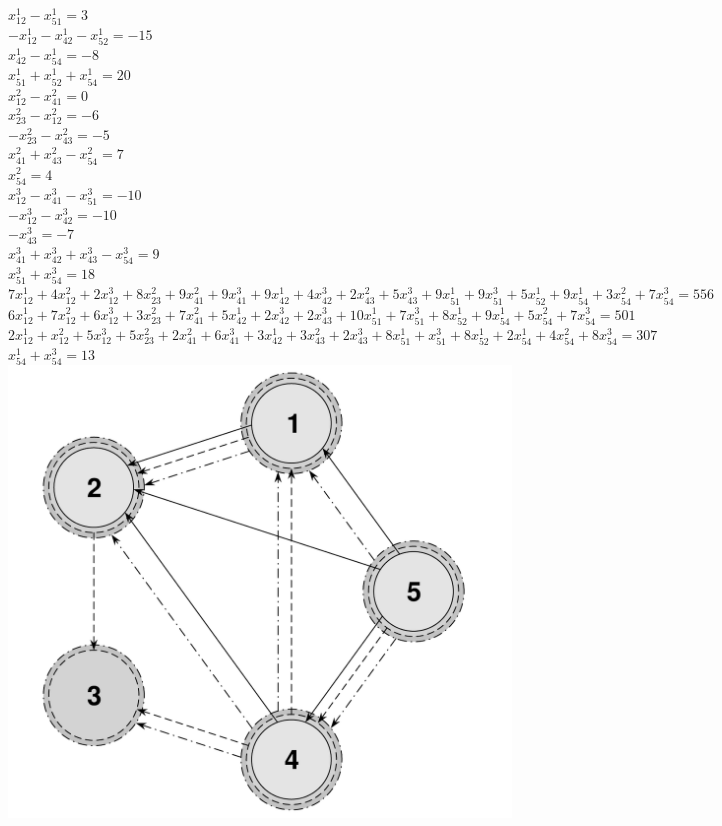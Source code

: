 \documentclass{article}
\begin{document}
\begin{center}
\bigskip
$x_{12}^{1}-x_{51}^{1}=3$\\
$-x_{12}^{1}-x_{42}^{1}-x_{52}^{1}=-15$\\
$x_{42}^{1}-x_{54}^{1}=-8$\\
$x_{51}^{1}+x_{52}^{1}+x_{54}^{1}=20$\\
\bigskip
$x_{12}^{2}-x_{41}^{2}=0$\\
$x_{23}^{2}-x_{12}^{2}=-6$\\
$-x_{23}^{2}-x_{43}^{2}=-5$\\
$x_{41}^{2}+x_{43}^{2}-x_{54}^{2}=7$\\
$x_{54}^{2}=4$\\
\bigskip
$x_{12}^{3}-x_{41}^{3}-x_{51}^{3}=-10$\\
$-x_{12}^{3}-x_{42}^{3}=-10$\\
$-x_{43}^{3}=-7$\\
$x_{41}^{3}+x_{42}^{3}+x_{43}^{3}-x_{54}^{3}=9$\\
$x_{51}^{3}+x_{54}^{3}=18$\\
\bigskip
$7x_{12}^{1}+4x_{12}^{2}+2x_{12}^{3}+8x_{23}^{2}+9x_{41}^{2}+9x_{41}^{3}+9x_{42}^{1}+4x_{42}^{3}+2x_{43}^{2}+5x_{43}^{3}+9x_{51}^{1}+9x_{51}^{3}+5x_{52}^{1}+9x_{54}^{1}+3x_{54}^{2}+7x_{54}^{3}=556$\\
\bigskip
$6x_{12}^{1}+7x_{12}^{2}+6x_{12}^{3}+3x_{23}^{2}+7x_{41}^{2}+5x_{42}^{1}+2x_{42}^{3}+2x_{43}^{3}+10x_{51}^{1}+7x_{51}^{3}+8x_{52}^{1}+9x_{54}^{1}+5x_{54}^{2}+7x_{54}^{3}=501$\\
\bigskip
$2x_{12}^{1}+x_{12}^{2}+5x_{12}^{3}+5x_{23}^{2}+2x_{41}^{2}+6x_{41}^{3}+3x_{42}^{1}+3x_{43}^{2}+2x_{43}^{3}+8x_{51}^{1}+x_{51}^{3}+8x_{52}^{1}+2x_{54}^{1}+4x_{54}^{2}+8x_{54}^{3}=307$\\
\bigskip
$x_{54}^{1}+x_{54}^{3}=13$\\
\bigskip
\includegraphics{graph}\\
\bigskip
\end{center}
\end{document}
